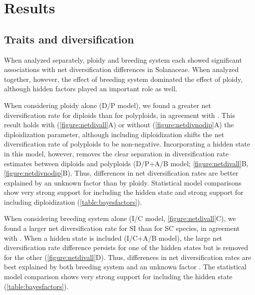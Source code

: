 \section{Results}

\subsection{Traits and diversification}

When analyzed separately, ploidy and breeding system each showed significant associations with net diversification differences in Solanaceae.
When analyzed together, however, the effect of breeding system dominated the effect of ploidy, although hidden factors played an important role as well.

When considering ploidy alone (D/P model), we found a greater net diversification rate for diploids than for polyploids, in agreement with \citep{mayrose_2011, mayrose_2015}.
This result holds with (\cref{figure:netdivall}A) or without (\cref{figure:netdivnodip}A) the diploidization parameter, although including diploidization shifts the net diversification rate of polyploids to be non-negative.
Incorporating a hidden state in this model, however, removes the clear separation in diversification rate estimates between diploids and polyploids (D/P+A/B model; \cref{figure:netdivall}B, \cref{figure:netdivnodip}B).
Thus, differences in net diversification rates are better explained by an unknown factor than by ploidy.
Statistical model comparisons show very strong support for including the hidden state and strong support for including diploidization (\cref{table:bayesfactors}).

When considering breeding system alone (I/C model, \cref{figure:netdivall}C), we found a larger net diversification rate for SI than for SC species, in agreement with \citet{goldberg_2010}.
When a hidden state is included (I/C+A/B model), the large net diversification rate difference persists for one of the hidden states but is removed for the other (\cref{figure:netdivall}D).
Thus, differences in net diversification rates are best explained by both breeding system and an unknown factor \citep[as in Onagraceae;][]{freyman_2019}.
The statistical model comparison shows very strong support for including the hidden state (\cref{table:bayesfactors}).

